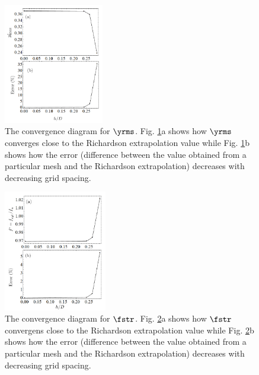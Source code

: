 \documentclass[a4paper,fleqn]{cas-sc}
\begin{document}
\begin{figure}
  \centering
  \includegraphics[width=0.39\textwidth]{figs/figure7}
  \caption{The convergence diagram for $\yrms$. Fig. \ref{fig:yrmsGCI}a shows how $\yrms$ converges close to the Richardson extrapolation value while Fig. \ref{fig:yrmsGCI}b shows how the error (difference between the value obtained from a particular mesh and the Richardson extrapolation) decreases with decreasing grid spacing.} \label{fig:yrmsGCI}
\end{figure}

\begin{figure}
  \centering
  \includegraphics[width=0.4\textwidth]{figs/figure8}
  \caption{The convergence diagram for $\fstr$. Fig. \ref{fig:fstrGCI}a shows how $\fstr$ convergens close to the Richardson extrapolation value while Fig. \ref{fig:fstrGCI}b shows how the error (difference between the value obtained from a particular mesh and the Richardson extrapolation) decreases with decreasing grid spacing.} \label{fig:fstrGCI}
\end{figure}
\end{document}
